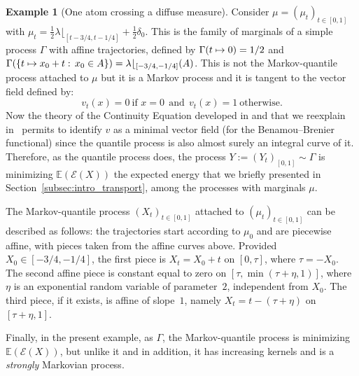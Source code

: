 \documentclass[11pt]{article}
\newcommand\mto{\mathchoice{\longmapsto}{\mapsto}{\mapsto}{\mapsto}}
\theoremstyle{plain}
\theoremstyle{definition}
\newtheorem{ex}[them]{Example}
\newcommand{\EE}{{\mathcal E}}
\newcommand{\E}{\mathbb{E}}
\begin{document}
\begin{ex}[One atom crossing a diffuse measure]\label{ex:strongmarkov}
Consider $\mu=(\mu_t)_{t\in [0,1]}$ with $\mu_t=\frac12 \lambda\lfloor_{[t-3/4,t-1/4]}+\frac12 \delta_{0}$. This is the family of marginals of a simple process $\Gamma$ with affine trajectories, defined by $\Gamma(t\mto 0)=1/2$ and $\Gamma(\{t\mto x_0+t:\,x_0\in A\})=\lambda\lfloor_{[-3/4,-1/4]}(A)$. This is not the Markov-quantile process attached to $\mu$ but it is a Markov process and it is tangent to the vector field defined by:
\[v_t(x)=0\ \text{if }x=0\ \ \text{and}\ \ v_t(x)=1\ \text{otherwise.}\]
Now the theory of the Continuity Equation developed in \cite{AGS} and that we reexplain in~\cite{BouJui2} permits to identify $v$ as a minimal vector field (for the Benamou--Brenier functional) since the quantile process is also almost surely an integral curve of it. Therefore, as the quantile process does, the process $Y:=(Y_t)_{[0,1]}\sim\Gamma$ is minimizing $\E(\EE(X))$ the expected energy that we briefly presented in Section~\ref{subsec:intro_transport}, among the processes with marginals $\mu$.

The Markov-quantile process $(X_t)_{t\in [0,1]}$ attached to $(\mu_t)_{t\in[0,1]}$ can be described as follows: the trajectories start according to $\mu_0$ and are piecewise affine, with pieces taken from the affine curves above. Provided $X_0\in [-3/4,-1/4]$, the first piece is $X_t=X_0+t$ on $[0,\tau]$, where $\tau=-X_0$. The second affine piece is constant equal to zero on $[\tau,\min(\tau+\eta,1)]$, where $\eta$ is an exponential random variable of parameter~$2$, independent from $X_0$. The third piece, if it exists, is affine of slope~$1$, namely $X_t=t-(\tau+\eta)$ on $[\tau+\eta,1]$.

Finally, in the present example, as $\Gamma$, the Markov-quantile process is minimizing $\E(\EE(X))$, but unlike it and in addition, it has increasing kernels and is a \emph{strongly} Markovian process.
\end{ex}
\end{document}
